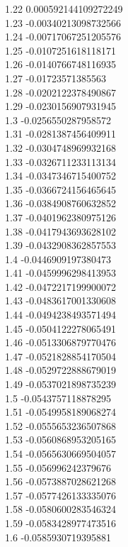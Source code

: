 {1.22	0.000592144109272249\\
1.23	-0.00340213098732566\\
1.24	-0.00717067251205576\\
1.25	-0.0107251618118171\\
1.26	-0.0140766748116935\\
1.27	-0.01723571385563\\
1.28	-0.0202122378490867\\
1.29	-0.0230156907931945\\
1.3	-0.0256550287958572\\
1.31	-0.0281387456409911\\
1.32	-0.0304748969932168\\
1.33	-0.0326711233113134\\
1.34	-0.0347346715400752\\
1.35	-0.0366724156465645\\
1.36	-0.0384908760632852\\
1.37	-0.0401962380975126\\
1.38	-0.0417943693628102\\
1.39	-0.0432908362857553\\
1.4	-0.0446909197380473\\
1.41	-0.0459996298413953\\
1.42	-0.0472217199900072\\
1.43	-0.0483617001330608\\
1.44	-0.0494238493571494\\
1.45	-0.0504122278065491\\
1.46	-0.0513306879770476\\
1.47	-0.0521828854170504\\
1.48	-0.0529722888679019\\
1.49	-0.0537021898735239\\
1.5	-0.0543757118878295\\
1.51	-0.0549958189068274\\
1.52	-0.0555653236507868\\
1.53	-0.0560868953205165\\
1.54	-0.0565630669504057\\
1.55	-0.056996242379676\\
1.56	-0.0573887028621268\\
1.57	-0.0577426133335076\\
1.58	-0.0580600283546324\\
1.59	-0.0583428977473516\\
1.6	-0.0585930719395881\\
}
